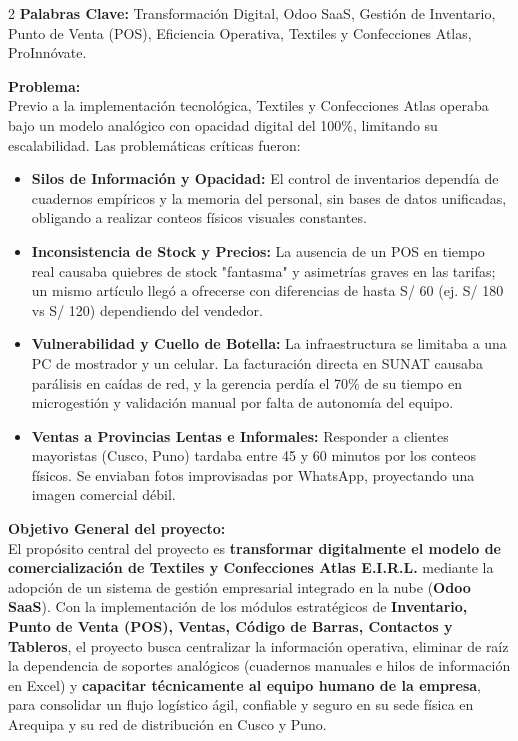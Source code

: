 \documentclass[12pt]{article}
\begin{document}
\newpage
\begin{multicols}{2}
\textbf{Palabras Clave:} Transformación Digital, Odoo SaaS, Gestión de Inventario, Punto de Venta (POS), Eficiencia Operativa, Textiles y Confecciones Atlas, ProInnóvate.

\textbf{Problema:}\\
Previo a la implementación tecnológica, Textiles y Confecciones Atlas operaba bajo un modelo analógico con opacidad digital del 100\%, limitando su escalabilidad. Las problemáticas críticas fueron:
\begin{itemize}
    \item \textbf{Silos de Información y Opacidad:} El control de inventarios dependía de cuadernos empíricos y la memoria del personal, sin bases de datos unificadas, obligando a realizar conteos físicos visuales constantes.
    \item \textbf{Inconsistencia de Stock y Precios:} La ausencia de un POS en tiempo real causaba quiebres de stock "fantasma" y asimetrías graves en las tarifas; un mismo artículo llegó a ofrecerse con diferencias de hasta S/ 60 (ej. S/ 180 vs S/ 120) dependiendo del vendedor.
    \item \textbf{Vulnerabilidad y Cuello de Botella:} La infraestructura se limitaba a una PC de mostrador y un celular. La facturación directa en SUNAT causaba parálisis en caídas de red, y la gerencia perdía el 70\% de su tiempo en microgestión y validación manual por falta de autonomía del equipo.
    \item \textbf{Ventas a Provincias Lentas e Informales:} Responder a clientes mayoristas (Cusco, Puno) tardaba entre 45 y 60 minutos por los conteos físicos. Se enviaban fotos improvisadas por WhatsApp, proyectando una imagen comercial débil.
\end{itemize}

\textbf{Objetivo General del proyecto:}\\
El propósito central del proyecto es \textbf{transformar digitalmente el modelo de comercialización de Textiles y Confecciones Atlas E.I.R.L.} mediante la adopción de un sistema de gestión empresarial integrado en la nube (\textbf{Odoo SaaS}). Con la implementación de los módulos estratégicos de \textbf{Inventario, Punto de Venta (POS), Ventas, Código de Barras, Contactos y Tableros}, el proyecto busca centralizar la información operativa, eliminar de raíz la dependencia de soportes analógicos (cuadernos manuales e hilos de información en Excel) y \textbf{capacitar técnicamente al equipo humano de la empresa}, para consolidar un flujo logístico ágil, confiable y seguro en su sede física en Arequipa y su red de distribución en Cusco y Puno.


\end{multicols}
\end{document}
